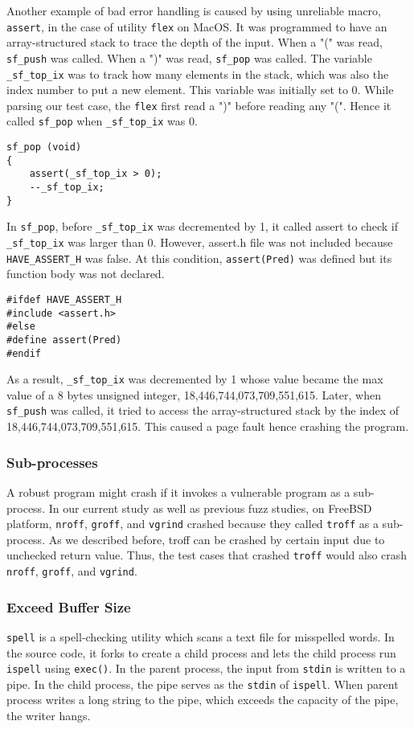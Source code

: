 Another example of bad error handling is caused by using unreliable macro, \texttt{assert}, in the case of utility \texttt{flex} on MacOS. It was programmed to have an array-structured stack to trace the depth of the input. When a "(" was read, \texttt{sf\_push} was called. When a ")" was read, \texttt{sf\_pop} was called. The variable \texttt{\_sf\_top\_ix} was to track how many elements in the stack, which was also the index number to put a new element. This variable was initially set to 0. While parsing our test case, the \texttt{flex} first read a ")" before reading any "(". Hence it called \texttt{sf\_pop} when \texttt{\_sf\_top\_ix} was 0. 

\begin{verbatim}
sf_pop (void)
{
    assert(_sf_top_ix > 0);
    --_sf_top_ix;
}
\end{verbatim}

In \texttt{sf\_pop}, before \texttt{\_sf\_top\_ix} was decremented by 1, it called assert to check if \texttt{\_sf\_top\_ix}  was larger than 0. However, assert.h file was not included because \texttt{HAVE\_ASSERT\_H} was false. At this condition, \texttt{assert(Pred)} was defined but its function body was not declared. 

\begin{verbatim}
#ifdef HAVE_ASSERT_H
#include <assert.h>
#else
#define assert(Pred)
#endif
\end{verbatim}

As a result, \texttt{\_sf\_top\_ix} was decremented by 1 whose value became the max value of a 8 bytes unsigned integer, 18,446,744,073,709,551,615. Later, when \texttt{sf\_push} was called, it tried to access the array-structured stack by the index of 18,446,744,073,709,551,615. This caused a page fault hence crashing the program.

\subsubsection{Sub-processes}
A robust program might crash if it invokes a vulnerable program as a sub-process. In our current study as well as previous fuzz studies, on FreeBSD platform, \texttt{nroff}, \texttt{groff}, and \texttt{vgrind} crashed because they called \texttt{troff} as a sub-process. As we described before, troff can be crashed by certain input due to unchecked return value. Thus, the test cases that crashed \texttt{troff} would also crash \texttt{nroff}, \texttt{groff}, and \texttt{vgrind}.

\subsubsection{Exceed Buffer Size}
\texttt{spell} is a spell-checking utility which scans a text file for misspelled words. In the source code, it forks to create a child process and lets the child process run \texttt{ispell} using \texttt{exec()}. In the parent process, the input from \texttt{stdin} is written to a pipe. In the child process, the pipe serves as the \texttt{stdin} of \texttt{ispell}. When parent process writes a long string to the pipe, which exceeds the capacity of the pipe, the writer hangs.



